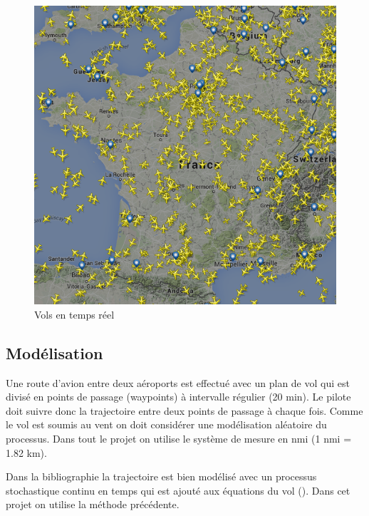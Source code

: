 \documentclass[a4paper, 12pt,twoside]{article}
\numberwithin{equation}{subsection}
\begin{document}
	\begin{figure}[htbp]
		\centering
		\begin{minipage}[b]{0.5\textwidth}
			\includegraphics[width=\textwidth]{Images/VolsFrance}
		\caption{Vols en temps réel}
		\label{fig:Vols}
		\end{minipage}
	\end{figure}
	
	
	\subsection{Modélisation} %
	\label{sub:modelisation}
	
	Une route d'avion entre deux aéroports est effectué avec un plan de vol qui est divisé en points de passage (waypoints) à intervalle régulier (20 min). Le pilote doit suivre donc la trajectoire entre deux points de passage à chaque fois. Comme le vol est soumis au vent on doit considérer une modélisation aléatoire du processus. Dans tout le projet on utilise le système de mesure en nmi (1 nmi = 1.82 km).
	
	Dans la bibliographie la trajectoire est bien modélisé avec un processus stochastique continu en temps qui est ajouté aux équations du vol (\cite{prandini2005probabilistic}). Dans cet projet on utilise la méthode précédente.
	
\end{document}
